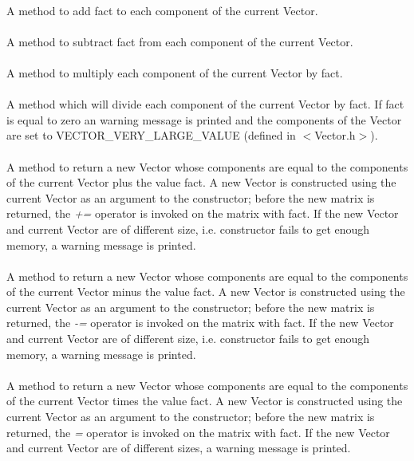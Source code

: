 \\
A method to add \p fact to each component of the current Vector. \\

 \\
A method to subtract \p fact from each component of the current Vector. \\

 \\
A method to multiply each component of the current Vector by fact. \\

 \\
A method which will divide each component of the current Vector by
\p fact. If \p fact is equal to zero an warning message is printed
and the components of the Vector are set to VECTOR\_VERY\_LARGE\_VALUE
(defined in $<$Vector.h$>$). \\

 \\
A method to return a new Vector whose components are equal to the
components of the current Vector plus the value \p fact. A new Vector
is constructed using the current Vector as an argument to the
constructor; before the new matrix is returned, the {\em +=} operator
is invoked on the matrix with \p fact. If the new Vector and
current Vector are of different size, i.e. constructor fails to get
enough memory, a warning message is printed. \\ 

 \\
A method to return a new Vector whose components are equal to the
components of the current Vector minus the value \p fact.  A new Vector
is constructed using the current Vector as an argument to the
constructor; before the new matrix is returned, the {\em -=} operator
is invoked on the matrix with \p fact. If the new Vector and
current Vector are of different size, i.e. constructor fails to get
enough memory, a warning message is printed. \\ 


 \\
A method to return a new Vector whose components are equal to the
components of the current Vector times the value \p fact.  A new Vector
is constructed using the current Vector as an argument to the
constructor; before the new matrix is returned, the {\em *=} operator
is invoked on the matrix with \p fact. If the new Vector and
current Vector are of different sizes, a warning message is printed. \\


